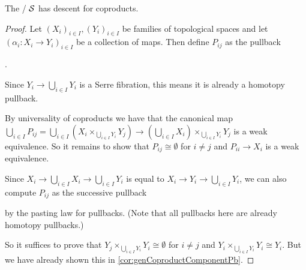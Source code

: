 \begin{lemma}
    The \inftycat/ $\mathcal{S}$ has descent for coproducts.
    \begin{proof}
        	Let $\left(X_i\right)_{i\in I}, \left(Y_i\right)_{i\in I}$ be families of topological spaces and let $\left(\alpha_i\colon X_i\to Y_i\right)_{i\in I}$ be a collection of maps.
            Then define $P_{ij}$ as the pullback
            \begin{center}
                \;.
            \end{center}
            Since $Y_i\to\bigcup\limits_{i\in I}Y_i$ is a Serre fibration, this means it is already a homotopy pullback.
            
            By universality of coproducts we have that the canonical map $\bigcup\limits_{i\in I} P_{ij}=\bigcup\limits_{i\in I} \left(X_i\times_{\bigcup\limits_{i\in I}Y_i}Y_j\right)\to \left(\bigcup\limits_{i\in I}X_i\right)\times_{\bigcup\limits_{i\in I}Y_i}Y_j$ is a weak equivalence.
            So it remains to show that $P_{ij}\cong\emptyset$ for $i\neq j$ and $P_{ii}\to X_i$ is a weak equivalence.

            Since $X_i\to\bigcup\limits_{i\in I}X_i\to\bigcup\limits_{i\in I}Y_i$ is equal to $X_i\to Y_i\to\bigcup\limits_{i\in I}Y_i$, we can also compute $P_{ij}$ as the successive pullback
            \begin{center}
            \end{center}
            by the pasting law for pullbacks.
            (Note that all pullbacks here are already homotopy pullbacks.)

            So it suffices to prove that $Y_j\times_{\bigcup\limits_{i\in I}Y_i} Y_i\cong\emptyset$ for $i\neq j$ and $Y_i\times_{\bigcup\limits_{i\in I}Y_i} Y_i\cong Y_i$. 
            But we have already shown this in \cref{cor:genCoproductComponentPb}.
    \end{proof}
\end{lemma}
